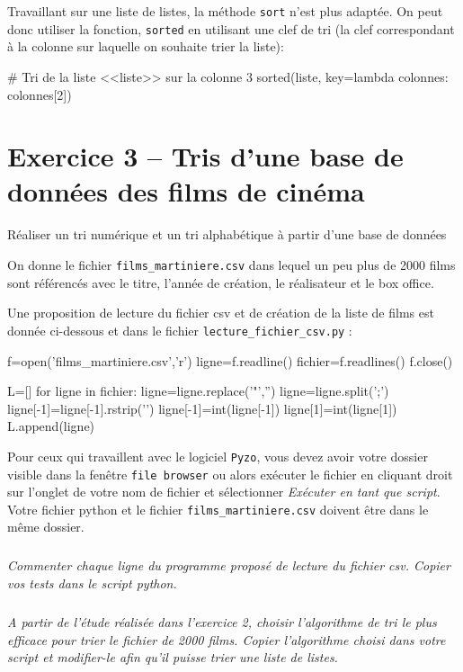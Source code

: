 \documentclass[10pt,fleqn]{article} %
\begin{document}
\begin{multicols}{2}
\begin{rem}
Travaillant sur une liste de listes, la méthode \texttt{sort} n'est plus adaptée. On peut donc utiliser la fonction, \texttt{sorted} en utilisant une clef de tri (la clef correspondant à la colonne sur laquelle on souhaite trier la liste): 
\end{rem}
\begin{python}
# Tri de la liste <<liste>> sur la colonne 3
sorted(liste, key=lambda colonnes: colonnes[2])
\end{python}


\section*{Exercice 3 -- Tris d'une base de données des films de cinéma}

\begin{obj}
Réaliser un tri numérique et un tri alphabétique à partir d'une base de données
\end{obj}

On donne le fichier \texttt{films\_martiniere.csv} dans lequel un peu plus de 2000 films sont référencés avec le titre, l'année de création, le réalisateur et le box office.

Une proposition de lecture du fichier csv et de création de la liste de films est donnée ci-dessous et dans le fichier \texttt{lecture\_fichier\_csv.py} :

\begin{python}
f=open('films_martiniere.csv','r')
ligne=f.readline()
fichier=f.readlines()
f.close()

L=[]
for ligne in fichier:
    ligne=ligne.replace('"','')
    ligne=ligne.split(';')
    ligne[-1]=ligne[-1].rstrip('\n')
    ligne[-1]=int(ligne[-1])
    ligne[1]=int(ligne[1])
    L.append(ligne)
\end{python}

Pour ceux qui travaillent avec le logiciel \texttt{Pyzo}, vous devez avoir votre dossier visible dans la fenêtre \texttt{file browser} ou alors exécuter le fichier en cliquant droit sur l'onglet de votre nom de fichier et sélectionner \textit{Exécuter en tant que script}. Votre fichier python et le fichier \texttt{films\_martiniere.csv} doivent être dans le même dossier.

\subparagraph{}
\textit{Commenter chaque ligne du programme proposé de lecture du fichier csv. Copier vos tests dans le script python.}

\subparagraph{}
\textit{A partir de l'étude réalisée dans l'exercice 2, choisir l'algorithme de tri le plus efficace pour trier le fichier de 2000 films. Copier l'algorithme choisi dans votre script et modifier-le afin qu'il puisse trier une liste de listes.}


\end{multicols}
\end{document}
